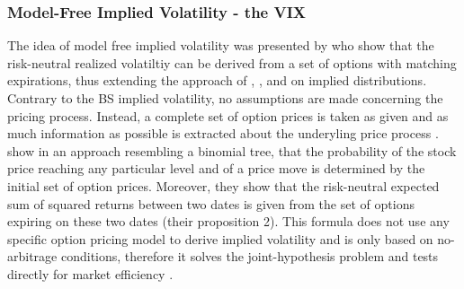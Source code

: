 \subsubsection{Model-Free Implied Volatility - the VIX}\label{sec:223VIX}
The idea of model free implied volatility was presented by \textcite{britten2000} who show that the risk-neutral realized volatiltiy can be derived from a set of options with matching expirations, thus extending the approach of \textcite{derman1994}, \textcite{dupire1994}, \textcite{dupire1997} and \textcite{rubinstein1994} on implied distributions. Contrary to the \ac{BS} implied volatility, no assumptions are made concerning the pricing process. Instead, a complete set of option prices is taken as given and as much information as possible is extracted about the underyling price process \parencite{britten2000}. \\
\textcite{britten2000} show in an approach resembling a binomial tree, that the probability of the stock price reaching any particular level and of a price move is determined by the initial set of option prices. Moreover, they show that the risk-neutral expected sum of squared returns between two dates is given from the set of options expiring on these two dates (their proposition 2). This formula does not use any specific option pricing model to derive implied volatility and is only based on no-arbitrage conditions, therefore it solves the joint-hypothesis problem and tests directly for market efficiency \parencite{jiang2003}. \\
